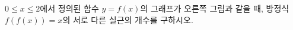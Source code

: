 \noindent\begin{minipage}[t]{0.58\linewidth}\vspace{0pt}\raggedright $0\le x\le 2$에서 정의된 함수 $y=f(x)$의 그래프가 오른쪽 그림과 같을 때, 방정식 $f(f(x))=x$의 서로 다른 실근의 개수를 구하시오.\end{minipage}\hfill\begin{minipage}[t]{0.4\linewidth}\vspace{0pt}\centering \resizebox{\ifdim\width>\linewidth\linewidth\else\width\fi}{!}{}\end{minipage}\par
